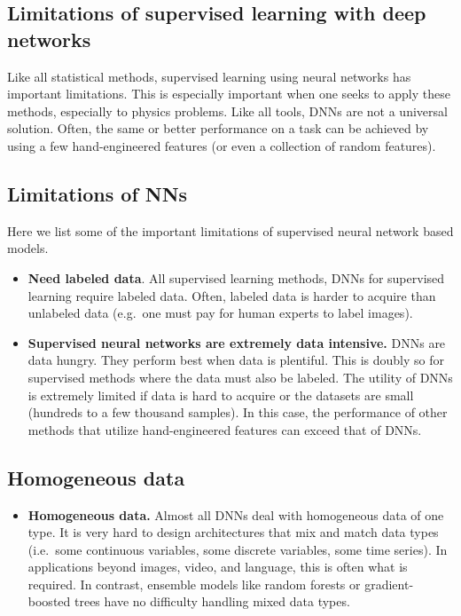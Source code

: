 \documentclass[%
oneside,                 %
final,                   %
10pt]{article}
\begin{document}
\subsection{Limitations of supervised learning with deep networks}

Like all statistical methods, supervised learning using neural
networks has important limitations. This is especially important when
one seeks to apply these methods, especially to physics problems. Like
all tools, DNNs are not a universal solution. Often, the same or
better performance on a task can be achieved by using a few
hand-engineered features (or even a collection of random
features). 

\subsection{Limitations of NNs}

Here we list some of the important limitations of supervised neural network based models. 

\begin{itemize}
\item \textbf{Need labeled data}. All supervised learning methods, DNNs for supervised learning require labeled data. Often, labeled data is harder to acquire than unlabeled data (e.g.~one must pay for human experts to label images).

\item \textbf{Supervised neural networks are extremely data intensive.} DNNs are data hungry. They perform best when data is plentiful. This is doubly so for supervised methods where the data must also be labeled. The utility of DNNs is extremely limited if data is hard to acquire or the datasets are small (hundreds to a few thousand samples). In this case, the performance of other methods that utilize hand-engineered features can exceed that of DNNs.
\end{itemize}

\noindent
\subsection{Homogeneous data}

\begin{itemize}
\item \textbf{Homogeneous data.} Almost all DNNs deal with homogeneous data of one type. It is very hard to design architectures that mix and match data types (i.e.~some continuous variables, some discrete variables, some time series). In applications beyond images, video, and language, this is often what is required. In contrast, ensemble models like random forests or gradient-boosted trees have no difficulty handling mixed data types.
\end{itemize}
\end{document}
